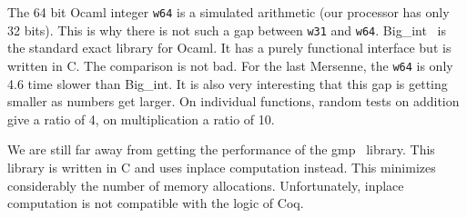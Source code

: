 The 64 bit {\sc Ocaml} integer {\tt w64} is a simulated arithmetic 
(our processor has only 32 bits).
This is why there is not such a gap between {\tt w31} and {\tt w64}. 
{\sc Big\_int}~\cite{bignum} is the  standard exact library for {\sc Ocaml}. 
It has a purely functional interface but 
is written in C. The comparison is not bad. For the last Mersenne, the {\tt w64}
is only 4.6 time slower than {\sc Big\_int}. 
It is also very interesting that this gap is getting smaller as numbers get larger. 
On individual functions, random tests on addition give a ratio of 4, on multiplication a ratio of 10.

We are still far away from getting the performance of the {\sc gmp}~\cite{GMP}
library. This library is written in C and uses inplace computation instead. 
This minimizes considerably the number of memory allocations.
Unfortunately, inplace computation is not compatible with 
the logic of {\sc Coq}.

